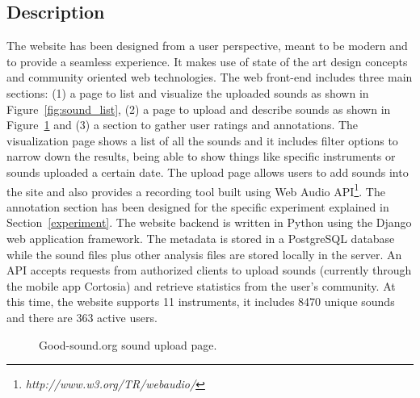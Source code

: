 \documentclass{article}
\begin{document}
\subsection{Description} 
The website has been designed from a user perspective, meant to be modern and to provide a seamless experience. It makes use of state of the art design concepts and community oriented web technologies. The web front-end includes three main sections: (1) a page to list and visua\-lize the uploaded sounds as shown in Figure~\ref{fig:sound_list}, (2) a page to upload and describe sounds as shown in Figure~\ref{fig:upload} and (3) a section to gather user ratings and annotations. The visualization page shows a list of all the sounds and it includes filter options to narrow down the results, being able to show things like specific instruments or sounds uploaded a certain date. The upload page allows users to add sounds into the site and also provides a recording tool built using Web Audio API\footnote{\textit{http://www.w3.org/TR/webaudio/}}. The annotation section has been designed for the specific experiment explained in Section~\ref{experiment}. 
The website backend is written in Python using the Django web application framework. The metadata is stored in a PostgreSQL database while the sound files plus other analysis files are stored locally in the server. An API accepts requests from authorized clients to upload sounds (currently through the mobile app Cortosia) and retrieve statistics from the user’s community. At this time, the website supports 11 instruments, it includes 8470 unique sounds and there are 363 active users. 

\begin{figure}
 \centerline{}
 \caption{Good-sound.org sound upload page.}
 \label{fig:upload}
\end{figure}
\end{document}
